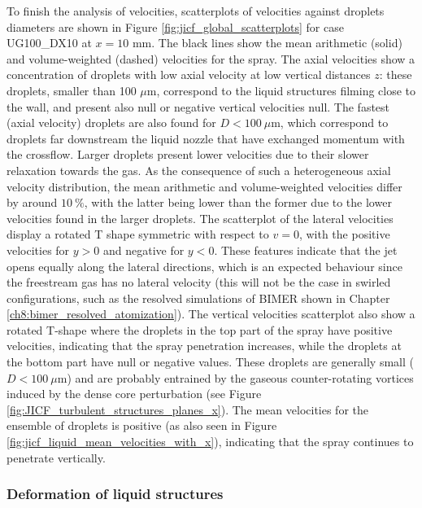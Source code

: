 To finish the analysis of velocities, scatterplots of velocities against droplets diameters are shown in Figure \ref{fig:jicf_global_scatterplots} for case UG100\_DX10 at $x = 10$ mm. The black lines show the mean arithmetic (solid) and volume-weighted (dashed) velocities for the spray. The axial velocities show a concentration of droplets with low axial velocity at low vertical distances $z$: these droplets, smaller than 100 $\mu$m, correspond to the liquid structures filming close to the wall, and present also null or negative vertical velocities null. The fastest (axial velocity) droplets are also found for $D < 100 ~\mu$m, which correspond to droplets far downstream the liquid nozzle that have exchanged momentum with the crossflow. Larger droplets present lower velocities due to their slower relaxation towards the gas. As the consequence of such a heterogeneous axial velocity distribution, the mean arithmetic and volume-weighted velocities differ by around $10~\%$, with the latter being lower than the former due to the lower velocities found in the larger droplets. The scatterplot of the lateral velocities display a rotated T shape symmetric with respect to $v = 0$, with the positive velocities for $y > 0$ and negative for $y < 0$. These features indicate that the jet opens equally along the lateral directions, which is an expected behaviour since the freestream gas has no lateral velocity (this will not be the case in swirled configurations, such as the resolved simulations of BIMER shown in Chapter \ref{ch8:bimer_resolved_atomization}). The vertical velocities scatterplot also show a rotated T-shape where the droplets in the top part of the spray have positive velocities, indicating that the spray penetration increases, while the droplets at the bottom part have null or negative values. These droplets are generally small ($D < 100~\mu$m) and are probably entrained by the gaseous counter-rotating vortices induced by the dense core perturbation (see Figure \ref{fig:JICF_turbulent_structures_planes_x}). The mean velocities for the ensemble of droplets is positive (as also seen in Figure \ref{fig:jicf_liquid_mean_velocities_with_x}), indicating that the spray continues to penetrate vertically. 



\subsubsection*{Deformation of liquid structures}
\label{subsubsec:def_liquid_structures}

